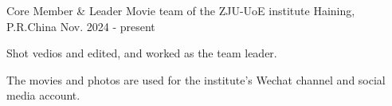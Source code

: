 

\begin{cventries}


  \cventry
    {Core Member \& Leader} %
    {Movie team of the ZJU-UoE institute} %
    {Haining, P.R.China} %
    {Nov. 2024 - present} %
    {
      \begin{cvitems} %
        \item {Shot vedios and edited, and worked as the team leader.}
        \item {The movies and photos are used for the institute's Wechat channel and social media account.}
      \end{cvitems}
    }


\end{cventries}
